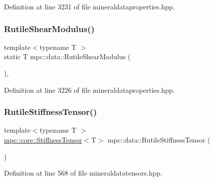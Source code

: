 Definition at line 3231 of file mineraldataproperties.\+hpp.

\mbox{\label{namespacempc_1_1data_ad81e8700e9875c885bc02c71de324534}} 
\subsubsection{\texorpdfstring{Rutile\+Shear\+Modulus()}{RutileShearModulus()}}
{\footnotesize\ttfamily template$<$typename T $>$ \\
static T mpc\+::data\+::\+Rutile\+Shear\+Modulus (\begin{DoxyParamCaption}{ }\end{DoxyParamCaption})\hspace{0.3cm}{\ttfamily [inline]}, {\ttfamily [static]}}



Definition at line 3226 of file mineraldataproperties.\+hpp.

\mbox{\label{namespacempc_1_1data_a28a3e64ae03e382992bf315c7b01ef94}} 
\subsubsection{\texorpdfstring{Rutile\+Stiffness\+Tensor()}{RutileStiffnessTensor()}}
{\footnotesize\ttfamily template$<$typename T $>$ \\
\mbox{\hyperlink{structmpc_1_1core_1_1_stiffness_tensor}{mpc\+::core\+::\+Stiffness\+Tensor}}$<$T$>$ mpc\+::data\+::\+Rutile\+Stiffness\+Tensor (\begin{DoxyParamCaption}{ }\end{DoxyParamCaption})}



Definition at line 568 of file mineraldatatensors.\+hpp.

\mbox{\label{namespacempc_1_1data_ae3cfbb5aa0ec9a928516d982839f302c}} 

